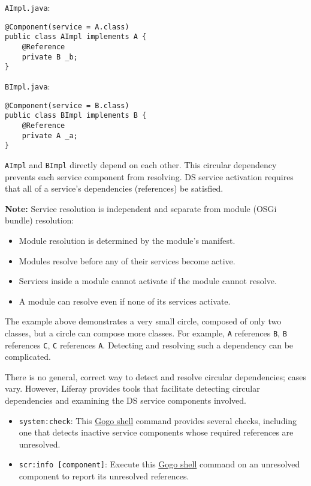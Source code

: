 \texttt{AImpl.java}:

\begin{verbatim}
@Component(service = A.class)
public class AImpl implements A {
    @Reference
    private B _b;
}
\end{verbatim}

\texttt{BImpl.java}:

\begin{verbatim}
@Component(service = B.class)
public class BImpl implements B {
    @Reference
    private A _a;
} 
\end{verbatim}

\texttt{AImpl} and \texttt{BImpl} directly depend on each other. This
circular dependency prevents each service component from resolving. DS
service activation requires that all of a service's dependencies
(references) be satisfied.

\textbf{Note:} Service resolution is independent and separate from
module (OSGi bundle) resolution:

\begin{itemize}
\tightlist
\item
  Module resolution is determined by the module's manifest.
\item
  Modules resolve before any of their services become active.
\item
  Services inside a module cannot activate if the module cannot resolve.
\item
  A module can resolve even if none of its services activate.
\end{itemize}

The example above demonstrates a very small circle, composed of only two
classes, but a circle can compose more classes. For example, \texttt{A}
references \texttt{B}, \texttt{B} references \texttt{C}, \texttt{C}
references \texttt{A}. Detecting and resolving such a dependency can be
complicated.

There is no general, correct way to detect and resolve circular
dependencies; cases vary. However, Liferay provides tools that
facilitate detecting circular dependencies and examining the DS service
components involved.

\begin{itemize}
\item
  \texttt{system:check}: This
  \href{/docs/7-2/customization/-/knowledge_base/c/using-the-felix-gogo-shell}{Gogo
  shell} command provides several checks, including one that detects
  inactive service components whose required references are unresolved.
\item
  \texttt{scr:info\ {[}component{]}}: Execute this
  \href{/docs/7-2/customization/-/knowledge_base/c/using-the-felix-gogo-shell}{Gogo
  shell} command on an unresolved component to report its unresolved
  references.
\end{itemize}

